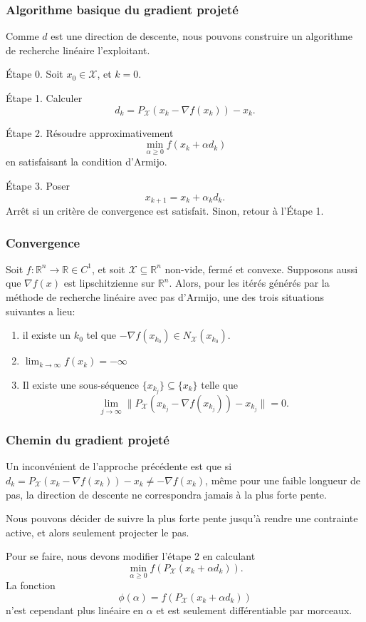 \documentclass[t,usepdftitle=false]{beamer}
\def\blue{\color{blue}}
\def\RR{\mathbb{R}}
\def\cX{\mathcal{X}}
\begin{document}
\begin{frame}
\frametitle{Algorithme basique du gradient projeté}

Comme $d$ est une direction de descente, nous pouvons construire un algorithme de recherche linéaire l'exploitant.

{\blue Étape 0.}
Soit $x_0 \in \cX$, et $k = 0$.

{\blue Étape 1.}
Calculer
$$
d_k = P_{\cX} (x_k - \nabla f(x_k)) - x_k.
$$

{\blue Étape 2.}
Résoudre approximativement
$$
\min_{\alpha \geq 0} f(x_k + \alpha d_k)
$$
en satisfaisant la condition d'Armijo.

{\blue Étape 3.}
Poser
$$
x_{k+1} = x_k + \alpha_k d_k.
$$
Arrêt si un critère de convergence est satisfait.
Sinon, retour à l'Étape 1.

\end{frame}

\begin{frame}
\frametitle{Convergence}

Soit $f: \mathbb{R}^n \rightarrow \mathbb{R} \in C^1$, et soit $\cX \subseteq \mathbb{R}^n$ non-vide, fermé et convexe.
Supposons aussi que $\nabla f(x)$ est lipschitzienne sur $\RR^n$.
Alors, pour les itérés générés par la méthode de recherche linéaire avec pas d'Armijo, une des trois situations suivantes a lieu:
\begin{enumerate}
\item
il existe un $k_0$ tel que $-\nabla f(x_{k_0}) \in N_{\cX}(x_{k_0})$.
\item
$\lim_{k \rightarrow \infty} f(x_k) = -\infty$
\item
Il existe une sous-séquence $\{ x_{k_j} \} \subseteq \{ x_{k} \}$
telle que
$$
\lim_{j \rightarrow \infty} \| P_{\cX}(x_{k_j} - \nabla f(x_{k_j})) - x_{k_j} \| = 0.
$$
\end{enumerate}

\end{frame}

%	

\begin{frame}
\frametitle{Chemin du gradient projeté}

Un inconvénient de l'approche précédente est que si
$d_k = P_{\cX} (x_k - \nabla f(x_k)) - x_k \ne -\nabla f(x_k)$,
même pour une faible longueur de pas, la direction de descente ne correspondra jamais à la plus forte pente.

\mbox{}

Nous pouvons décider de suivre la plus forte pente jusqu'à rendre une contrainte active, et alors seulement projecter le pas.

\mbox{}

Pour se faire, nous devons modifier l'étape 2 en calculant
$$
\min_{\alpha \geq 0} f(P_{\cX}(x_k + \alpha d_k)).
$$
La fonction
$$
\phi(\alpha) = f(P_{\cX}(x_k + \alpha d_k))
$$
n'est cependant plus linéaire en $\alpha$ et est seulement différentiable par morceaux.

\end{frame}
\end{document}
